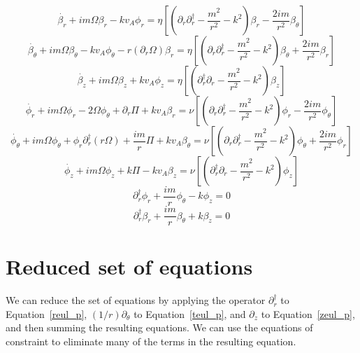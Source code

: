 \documentclass[letterpaper]{article}
\begin{document}
\begin{equation}\label{rind_p}
\dot{\beta_r} + im\Omega\beta_r - kv_A\phi_r = \eta\left[\left(\partial_r \partial_r^\dagger - \frac{m^2}{r^2} - k^2\right)\beta_r - \frac{2im}{r^2}\beta_\theta\right]
\end{equation}
\begin{equation}\label{tind_p}
\dot{\beta_\theta} + im\Omega\beta_\theta - kv_A \phi_\theta - r(\partial_r \Omega)\beta_r = \eta\left[\left(\partial_r \partial_r^\dagger - \frac{m^2}{r^2} - k^2\right)\beta_\theta + \frac{2im}{r^2}\beta_r\right]
\end{equation}
\begin{equation}\label{zind_p}
\dot{\beta_z} + im\Omega\beta_z + kv_A \phi_z = \eta\left[\left(\partial_r^\dagger \partial_r -\frac{m^2}{r^2} - k^2\right)\beta_z\right]
\end{equation}
\begin{equation}\label{reul_p}
\dot{\phi_r} + im\Omega\phi_r - 2\Omega\phi_\theta + \partial_r \Pi + kv_A\beta_r = \nu\left[\left(\partial_r \partial_r^\dagger - \frac{m^2}{r^2} - k^2\right)\phi_r - \frac{2im}{r^2}\phi_\theta\right]
\end{equation}
\begin{equation}\label{teul_p}
\dot{\phi_\theta} + im\Omega\phi_\theta + \phi_r \partial_r^\dagger(r\Omega) + \frac{im}{r}\Pi + kv_A \beta_\theta = \nu\left[\left(\partial_r \partial_r^\dagger - \frac{m^2}{r^2} - k^2\right)\phi_\theta + \frac{2im}{r^2}\phi_r\right]
\end{equation}
\begin{equation}\label{zeul_p}
\dot{\phi_z} + im\Omega{\phi_z} + k\Pi - kv_A \beta_z = \nu\left[\left(\partial_r^\dagger \partial_r - \frac{m^2}{r^2} - k^2\right)\phi_z\right]
\end{equation}
\begin{equation}\label{inc_p}
\partial_r^\dagger \phi_r + \frac{im}{r}\phi_\theta - k\phi_z = 0
\end{equation}
\begin{equation}\label{delB_p}
\partial_r^\dagger \beta_r + \frac{im}{r}\beta_\theta + k\beta_z = 0
\end{equation}

\section{Reduced set of equations}

We can reduce the set of equations by applying the operator
$\partial_r^\dagger$ to Equation~\ref{reul_p}, $(1/r)\partial_\theta$
to Equation~\ref{teul_p}, and $\partial_z$ to Equation~\ref{zeul_p},
and then summing the resulting equations.  We can use the equations of
constraint to eliminate many of the terms in the resulting equation.
\end{document}
